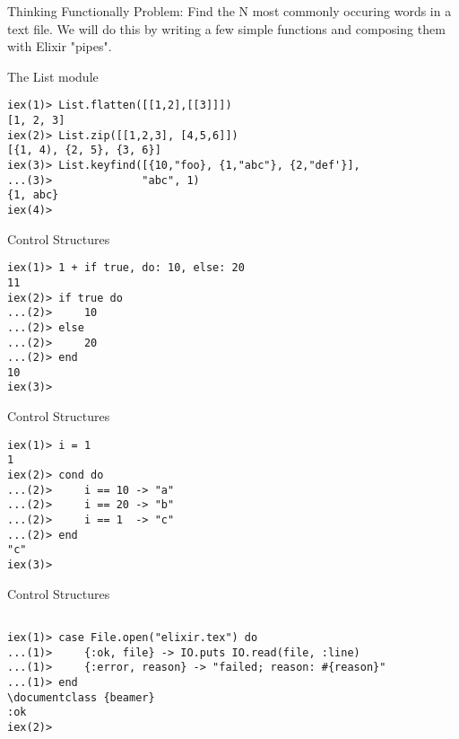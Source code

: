 \documentclass{beamer}
\begin{document}
\begin{frame}{Thinking Functionally}
Problem: Find the N most commonly occuring words in a text file. We will do this
by writing a few simple functions and composing them with Elixir "pipes".

\end{frame}

\begin{frame}[fragile]{The List module}

\begin{verbatim}
iex(1)> List.flatten([[1,2],[[3]]])
[1, 2, 3]
iex(2)> List.zip([[1,2,3], [4,5,6]])
[{1, 4), {2, 5}, {3, 6}]
iex(3)> List.keyfind([{10,"foo}, {1,"abc"}, {2,"def'}], 
...(3)>              "abc", 1)
{1, abc}
iex(4)> 
\end{verbatim}

\end{frame}
\begin{frame}[fragile]{Control Structures}

\begin{verbatim}
iex(1)> 1 + if true, do: 10, else: 20
11
iex(2)> if true do
...(2)>     10
...(2)> else
...(2)>     20
...(2)> end
10
iex(3)> 

\end{verbatim}
\end{frame}

\begin{frame}[fragile]{Control Structures}

\begin{verbatim}
iex(1)> i = 1
1
iex(2)> cond do
...(2)>     i == 10 -> "a"
...(2)>     i == 20 -> "b"
...(2)>     i == 1  -> "c"
...(2)> end
"c"
iex(3)> 
\end{verbatim}
\end{frame}

\begin{frame}[fragile]{Control Structures}

\begin{verbatim}

iex(1)> case File.open("elixir.tex") do
...(1)>     {:ok, file} -> IO.puts IO.read(file, :line)
...(1)>     {:error, reason} -> "failed; reason: #{reason}"
...(1)> end
\documentclass {beamer}
:ok
iex(2)>

\end{verbatim}
\end{frame}
\end{document}
